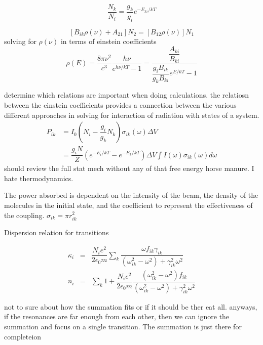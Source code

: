 \documentclass[11pt,a4paper]{book}
\begin{document}
\begin{equation}
\dfrac{N_k}{N_i}=\dfrac{g_k}{g_i} e^{-E_{ki}/kT}
\end{equation}	

\begin{equation}
\left[ B_{ik}\rho({\nu}) + A_{21} \right]N_2 
= 
\left[ B_{12}\rho({\nu}) \right] N_1
\end{equation}
solving for $\rho(\nu)$ in terms of einstein coefficients	
\begin{equation}
\displaystyle
\rho(E)=\dfrac{8\pi \nu^2}{c^3}\dfrac{h\nu}{e^{h\nu/kT}-1}
=
\dfrac{\dfrac{A_{ki}}{B_{ki}}}{\dfrac{g_i B_{ik}}{g_k B_{ki}} e^{E/kT} - 1}
\end{equation}


determine which relations are important when doing calculations. the relatiosn between the einstein coefficients provides a connection between the various different approaches in solving for interaction of radiation with states of a system.
\begin{equation}
\begin{split}
\displaystyle
P_{ik} &= I_0 \left(N_i -\dfrac{g_i}{g_k} N_k
\right) 
\sigma_{ik}(\omega)\Delta V \\
& = \dfrac{g_iN}{Z} \left( e^{-E_i/kT}- e^{-E_k/kT}
\right)
\Delta V \int{I(\omega)\sigma_{ik}(\omega)d\omega}
\end{split}
\end{equation}
should review the full stat mech without any of that free energy horse manure. I hate thermodynamics.	

The power absorbed is dependent on the intensity of the beam, the density of the molecules in the initial state, and the coefficient to represent the effectiveness of the coupling. $\sigma_{ik}=\pi r_{ik}^2$

Dispersion relation for transitions

\begin{eqnarray}
\kappa_i & = & \dfrac{N_i e^2}{2 \epsilon_0 m} \sum_k {
	\dfrac{\omega f_{ik}\gamma_{ik}}
	{\left(\omega_{ik}^2-\omega^2\right)+\gamma_{ik}^2\omega^2}
}\\
n_i & = & \sum_k { 1 + \dfrac{N_i e^2}{2 \epsilon_0 m} \dfrac{\left(\omega^2_{ik}-\omega^2 \right) f_{ik}}
	{\left(\omega_{ik}^2-\omega^2\right)+\gamma_{ik}^2\omega^2}
}
\end{eqnarray}

not to sure about how the summation fits or if it should be ther eat all. anyways, if the resonances are far enough from each other, then we can ignore the summation and focus on a single transition. The summation is just there for completeion
\end{document}
